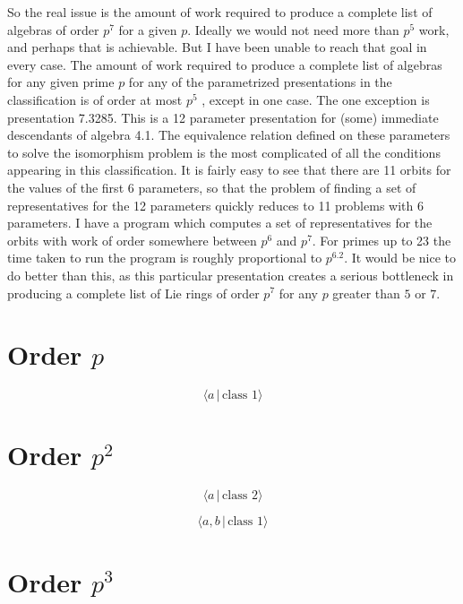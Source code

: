 \documentclass[10pt]{article}
\begin{document}
So the real issue is the amount of work required to produce a complete list
of algebras of order $p^{7}$ for a given $p$. Ideally we would not need more
than $p^{5}$ work, and perhaps that is achievable. But I have been unable to
reach that goal in every case. The amount of work required to produce a
complete list of algebras for any given prime $p$ for any of the
parametrized presentations in the classification is of order at most $p^{5}$%
, except in one case. The one exception is presentation 7.3285. This is a 12
parameter presentation for (some) immediate descendants of algebra 4.1. The
equivalence relation defined on these parameters to solve the isomorphism
problem is the most complicated of all the conditions appearing in this
classification. It is fairly easy to see that there are 11 orbits for the
values of the first 6 parameters, so that the problem of finding a set of
representatives for the 12 parameters quickly reduces to 11 problems with 6
parameters. I have a program which computes a set of representatives for the
orbits with work of order somewhere between $p^{6}$ and $p^{7}$. For primes
up to 23 the time taken to run the program is roughly proportional to $%
p^{6.2}$. It would be nice to do better than this, as this particular
presentation creates a serious bottleneck in producing a complete list of
Lie rings of order $p^{7}$ for any $p$ greater than $5$ or $7$.

\section{Order $p$}

\begin{equation}
\langle a\,|\,\text{class }1\rangle  \tag{1.0}
\end{equation}

\section{Order $p^{2}$}

\begin{equation}
\langle a\,|\,\text{class }2\rangle  \tag{2.0}
\end{equation}

\begin{equation}
\langle a,b\,|\,\text{class }1\rangle  \tag{2.1}
\end{equation}

\section{Order $p^{3}$}
\end{document}
